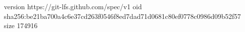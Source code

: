 version https://git-lfs.github.com/spec/v1
oid sha256:be21ba700a4c6e37cd263f0546f8ed7dad71d0681c80ef0778c0986d09b52f57
size 174916
